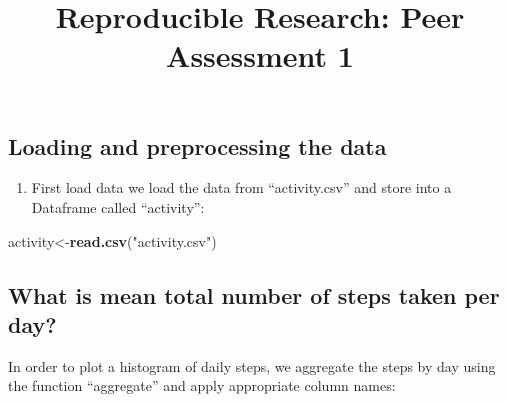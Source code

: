 \documentclass[]{article}
\title{Reproducible Research: Peer Assessment 1}
\author{}
\date{}
\newenvironment{Shaded}{\begin{snugshade}}{\end{snugshade}}
\newcommand{\KeywordTok}[1]{\textcolor[rgb]{0.13,0.29,0.53}{\textbf{#1}}}
\newcommand{\DataTypeTok}[1]{\textcolor[rgb]{0.13,0.29,0.53}{#1}}
\newcommand{\StringTok}[1]{\textcolor[rgb]{0.31,0.60,0.02}{#1}}
\newcommand{\CommentTok}[1]{\textcolor[rgb]{0.56,0.35,0.01}{\textit{#1}}}
\newcommand{\OperatorTok}[1]{\textcolor[rgb]{0.81,0.36,0.00}{\textbf{#1}}}
\newcommand{\NormalTok}[1]{#1}
\providecommand{\tightlist}{%
  \setlength{\itemsep}{0pt}\setlength{\parskip}{0pt}}
\begin{document}
\maketitle

\subsection{Loading and preprocessing the
data}\label{loading-and-preprocessing-the-data}

\begin{enumerate}
\def\labelenumi{\arabic{enumi}.}
\tightlist
\item
  First load data we load the data from ``activity.csv'' and store into
  a Dataframe called ``activity'':
\end{enumerate}

\begin{Shaded}
\begin{Highlighting}[]
\NormalTok{activity<-}\KeywordTok{read.csv}\NormalTok{(}\StringTok{"activity.csv"}\NormalTok{)}
\end{Highlighting}
\end{Shaded}

\subsection{What is mean total number of steps taken per
day?}\label{what-is-mean-total-number-of-steps-taken-per-day}

In order to plot a histogram of daily steps, we aggregate the steps by
day using the function ``aggregate'' and apply appropriate column names:

\begin{Shaded}
\end{Shaded}
\end{document}

